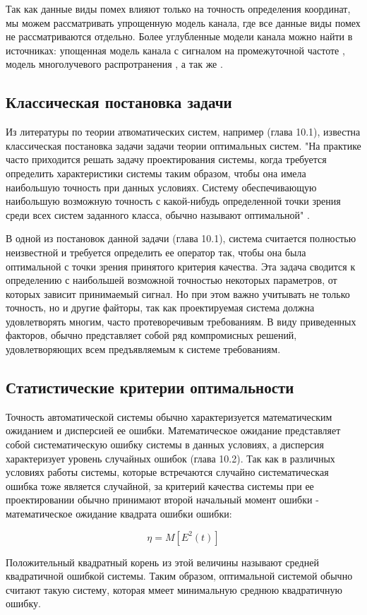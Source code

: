 Так как данные виды помех влияют только на точность определения координат, мы можем рассматривать упрощенную модель
канала, где все данные виды помех не рассматриваются отдельно. Более углубленные модели канала можно найти в
источниках: упощенная модель канала с сигналом на промежуточной частоте \cite{lei_dong_phd}, модель многолучевого
распротранения \cite{hannah_phd}, а так же \cite{burns_model, corbell_model, crs_model, brown_model}.
 
\subsection{Классическая постановка задачи}
\label{sec1_FIXME}

Из литературы по теории атвоматических систем, например \cite{pugachev} (глава 10.1), известна классическая постановка
задачи задачи теории оптимальных систем. "На практике часто приходится решать задачу проектирования системы, когда
требуется определить характеристики системы таким образом, чтобы она имела наибольшую точность при данных условиях.
Систему обеспечивающую наибольшую возможную точность с какой-нибудь определенной точки зрения среди всех систем
заданного класса, обычно называют оптимальной" \cite{pugachev}.

В одной из постановок данной задачи \cite{pugachev} (глава 10.1), система считается полностью неизвестной
и требуется определить ее оператор так, чтобы она была оптимальной с точки зрения принятого критерия качества. Эта
задача сводится к определению с наибольшей возможной точностью некоторых параметров, от которых зависит принимаемый
сигнал. Но при этом важно учитывать не только точность, но и другие файторы, так как проектируемая система должна
удовлетворять многим, часто протеворечивым требованиям. В виду приведенных факторов, обычно представляет собой
ряд компромисных решений, удовлетворяющих всем предъявляемым к системе требованиям.

\subsection{Статистические критерии оптимальности}
Точность автоматической системы обычно характеризуется математическим ожиданием и дисперсией ее ошибки.
Математическое ожидание представляет собой систематическую ошибку системы в данных условиях, а дисперсия
характеризует уровень случайных ошибок \cite{pugachev} (глава 10.2). Так как в различных условиях работы
системы, которые встречаются случайно систематическая ошибка тоже является случайной, за критерий качества
системы при ее проектировании обычно принимают второй начальный момент ошибки - математическое ожидание
квадрата ошибки ошибки:
\begin{center}
\begin{equation}
	\label{eq:stat_err_prob}
	\eta = M[E^2(t)]
\end{equation}
\end{center}
Положительный квадратный корень из этой величины называют средней квадратичной ошибкой системы. Таким образом,
оптимальной системой обычно считают такую систему, которая ммеет минимальную среднюю квадратичную ошибку.


